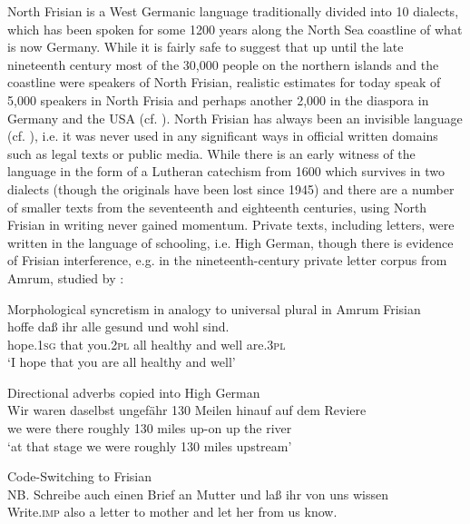 \documentclass[output=paper]{langsci/langscibook}
\begin{document}
North Frisian is a West Germanic language traditionally divided into 10 dialects, which has been spoken for some 1200 years along the North Sea coastline of what is now Germany. While it is fairly safe to suggest that up until the late nineteenth century most of the 30,000 people on the northern islands and the coastline were speakers of North Frisian, realistic estimates for today speak of 5,000 speakers in North Frisia and perhaps another 2,000 in the diaspora in Germany and the USA (cf. \citealt{Arhammar2008}). North Frisian has always been an invisible language (cf. \citealt{HavingaLanger2016}), i.e. it was never used in any significant ways in official written domains such as legal texts or public media. While there is an early witness of the language in the form of a Lutheran catechism from 1600 which survives in two dialects (though the originals have been lost since 1945) and there are a number of smaller texts from the seventeenth and eighteenth centuries, using North Frisian in writing never gained momentum. Private texts, including letters, were written in the language of schooling, i.e. High German, though there is evidence of Frisian interference, e.g. in the nineteenth-century private letter corpus from Amrum, studied by \citet{Jacobs-Owen2017}: 

\ea
\label{ex:gregersen:1}
 Morphological syncretism in analogy to universal plural in Amrum Frisian \\
	\gll hoffe daß ihr alle gesund und wohl sind.\\
     hope.\textsc{1sg} that you.\textsc{2pl} all healthy and well are.\textsc{3pl}\\
\glt ‘I hope that you are all healthy and well’ \citep[54]{Jacobs-Owen2017}
\z

\ea
\label{ex:gregersen:2}
 {Directional adverbs copied into High German} \\
\gll Wir waren daselbst ungefähr 130 Meilen hinauf auf dem Reviere  \\
     we were there roughly 130 miles up-on up the river\\
\glt ‘at that stage we were roughly 130 miles upstream’ \citep[71]{Jacobs-Owen2017}
\z

\ea\label{ex:gregersen:3}
 {Code-Switching to Frisian} \\
\gll NB. Schreibe auch einen Brief an Mutter und laß ihr von uns wissen\\
{ } Write.\textsc{imp} also a letter to mother and let her from us know. \\
\end{document}
